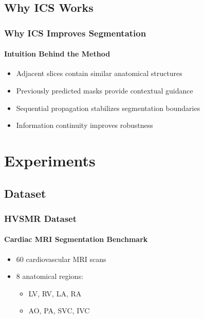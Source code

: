 \documentclass[nometaot,lecture,amberg,autotoc,toc=twocolumn,indicatelastpageofframe,footlinebox]{OTHAWbeamer}
\begin{document}
\subsection{Why ICS Works}

\begin{frame}
    \frametitle{Why ICS Improves Segmentation}
    \framesubtitle{Intuition Behind the Method}

    \begin{itemize}
        \item Adjacent slices contain similar anatomical structures

        \item Previously predicted masks provide contextual guidance

        \item Sequential propagation stabilizes segmentation boundaries

        \item Information continuity improves robustness
    \end{itemize}

\end{frame}


\section{Experiments}

\subsection{Dataset}

\begin{frame}
    \frametitle{HVSMR Dataset}
    \framesubtitle{Cardiac MRI Segmentation Benchmark}

    \begin{itemize}
        \item 60 cardiovascular MRI scans
        \item 8 anatomical regions:
        \begin{itemize}
            \item LV, RV, LA, RA
            \item AO, PA, SVC, IVC
        \end{itemize}
    \end{itemize}

    \vspace{1em}


\end{frame}
\end{document}

